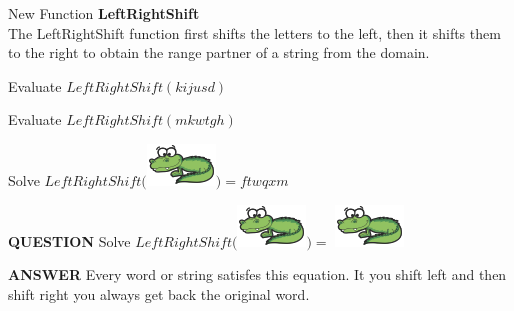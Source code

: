 \documentclass{ximera}
\begin{document}
\begin{exploration}
New Function \textbf{LeftRightShift}\\
The LeftRightShift function first shifts the letters to the left, then it shifts them to the right to obtain the range partner of a string from the domain.
\quad \\


\begin{question}
Evaluate $LeftRightShift(kijusd)$
\begin{multipleChoice}
\end{multipleChoice}
\end{question}





\begin{question}
Evaluate $LeftRightShift(mkwtgh)$
\begin{multipleChoice}
\end{multipleChoice}
\end{question}




\begin{question}
Solve $LeftRightShift($\includegraphics{pics/alligator.png}$) = ftwqxm$
\begin{multipleChoice}
\end{multipleChoice}
\end{question}





\begin{dialogue}
\item[\textbf{QUESTION}] Solve $LeftRightShift($\includegraphics{pics/alligator.png}$ ) = $ \includegraphics{pics/alligator.png}
\item[\textbf{ANSWER}] Every word or string satisfes this equation.  It you shift left and then shift right you always get back the original word.
\end{dialogue}

\end{exploration}
\end{document}
